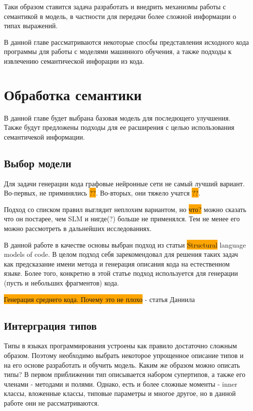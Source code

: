 \documentclass[times,specification,annotation]{itmo-student-thesis}
\begin{document}
Таки образом ставится задача разработать и внедрить механизмы работы с семантикой в модель, в частности для передачи более сложной информации о типах выражений.

\chapterconclusion
В данной главе рассматриваются некоторые спосбы представления исходного кода программы для работы с моделями машинного обучения, а также подходы к извлечению семантической инфорации из кода.


\chapter{Обработка семантики}

В данной главе будет выбрана базовая модель для последющего улучшения. Также будут предложены подходы для ее расширения с целью использования семантичекой информации.

\section{Выбор модели}\label{sec:chooseModel}
Для задачи генерации кода графовые нейронные сети не самый лучший вариант. Во-первых, не приминялись \colorbox{orange}{??}. Во-вторых, они тяжело учатся \colorbox{orange}{??}.

Подход со списком правил выглядит неплохим вариантом, но \colorbox{orange}{что?} можно сказать что он постарее, чем SLM и нигде(?) больше не применялся. Тем не менее его можно рассмотреть в дальнейших исследованиях.

В данной работе в качестве основы выбран подход из статьи \colorbox{orange}{Structural} language models of code. В целом подход себя зарекомендовал для решения таких задач как предсказание имени метода и генерация описания кода на естественном языке. Более того, конкретно в этой статье подход используется для генерации (пусть и небольших фрагментов) кода.

\colorbox{orange}{Генерация среднего кода. Почему это не плохо} - статья Даниила

\section{Интерграция типов}\label{typeIntro}
Типы в языках программирования устроены как правило достаточно сложным образом. Поэтому необходимо выбрать некоторое упрощенное описание типов и на его основе разработать и обучить модель. Каким же образом можно описать типы? В первом приближении тип описывается набором супертипов, а также его членами - методами и полями. Однако, есть и более сложные моменты - inner классы, вложенные классы, типовые параметры и многое другое, но в данной работе они не рассматриваются.
\end{document}

